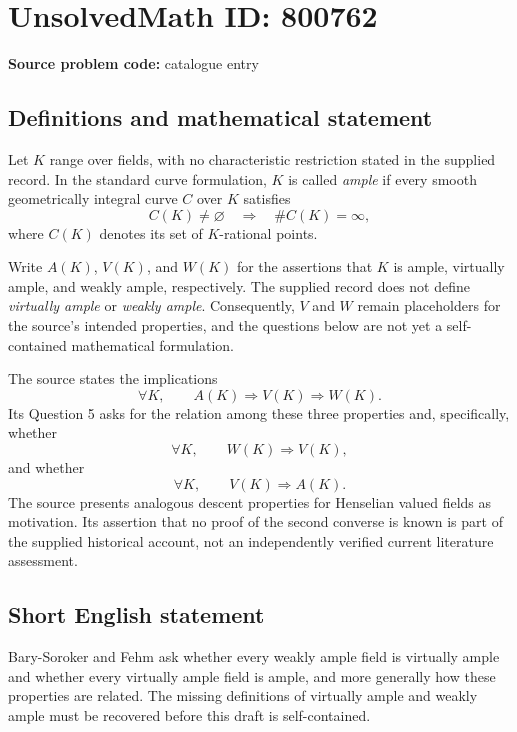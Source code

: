 \documentclass[11pt]{article}
\begin{document}
\section*{UnsolvedMath ID: 800762}
\textbf{Source problem code:} catalogue entry
\subsection{Definitions and mathematical statement}
Let \(K\) range over fields, with no characteristic restriction stated in the supplied record. In the standard curve formulation, \(K\) is called \emph{ample} if every smooth geometrically integral curve \(C\) over \(K\) satisfies
\[
C(K)\ne\varnothing\quad\Longrightarrow\quad \#C(K)=\infty,
\]
where \(C(K)\) denotes its set of \(K\)-rational points.

Write \(A(K)\), \(V(K)\), and \(W(K)\) for the assertions that \(K\) is ample, virtually ample, and weakly ample, respectively. The supplied record does not define \emph{virtually ample} or \emph{weakly ample}. Consequently, \(V\) and \(W\) remain placeholders for the source's intended properties, and the questions below are not yet a self-contained mathematical formulation.

The source states the implications
\[
\forall K,\qquad A(K)\Longrightarrow V(K)\Longrightarrow W(K).
\]
Its Question 5 asks for the relation among these three properties and, specifically, whether
\[
\forall K,\qquad W(K)\Longrightarrow V(K),
\]
and whether
\[
\forall K,\qquad V(K)\Longrightarrow A(K).
\]
The source presents analogous descent properties for Henselian valued fields as motivation. Its assertion that no proof of the second converse is known is part of the supplied historical account, not an independently verified current literature assessment.
\subsection{Short English statement}
Bary-Soroker and Fehm ask whether every weakly ample field is virtually ample and whether every virtually ample field is ample, and more generally how these properties are related. The missing definitions of virtually ample and weakly ample must be recovered before this draft is self-contained.
\end{document}
